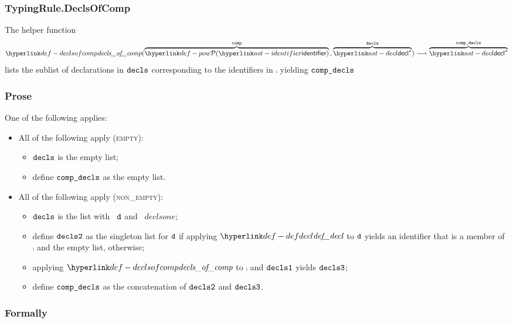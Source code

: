 
\subsubsection{TypingRule.DeclsOfComp \label{sec:TypingRule.DeclsOfComp}}
\hypertarget{def-declsofcomp}{}
The helper function
\[
\declsofcomp(
  \overname{\pow{\identifier}}{\comp} \aslsep
  \overname{\decl^*}{\decls}
) \aslto \overname{\decl^*}{\compdecls}
\]
lists the sublist of declarations in $\texttt{decls}$ corresponding to the identifiers in $\comp$
yielding $\texttt{comp\_decls}$

\subsubsection{Prose}
One of the following applies:
\begin{itemize}
  \item All of the following apply (\textsc{empty}):
  \begin{itemize}
    \item $\texttt{decls}$ is the empty list;
    \item define $\texttt{comp\_decls}$ as the empty list.
  \end{itemize}

  \item All of the following apply (\textsc{non\_empty}):
  \begin{itemize}
    \item $\texttt{decls}$ is the list with \head\ $\texttt{d}$ and \tail\ $declsone$;
    \item define $\texttt{decls2}$ as the singleton list for $\texttt{d}$ if applying $\defdecl$ to $\texttt{d}$ yields an identifier
          that is a member of $\comp$ and the empty list, otherwise;
    \item applying $\declsofcomp$ to $\comp$ and $\texttt{decls1}$ yields $\texttt{decls3}$;
    \item define $\texttt{comp\_decls}$ as the concatenation of $\texttt{decls2}$ and $\texttt{decls3}$.
  \end{itemize}
\end{itemize}

\subsubsection{Formally}

